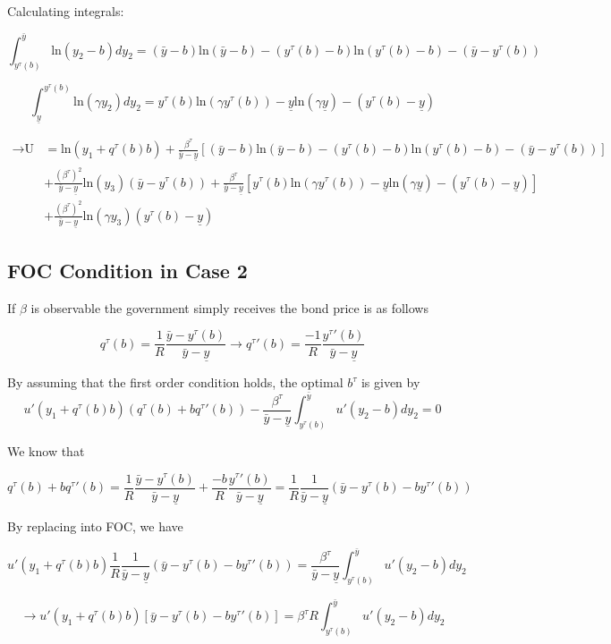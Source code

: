 \documentclass{article}
\begin{document}
Calculating integrals:

$$
\int_{y^\tau(b)}^{\bar{y}} \text{ln}(y_2 - b)dy_2 = (\bar{y} - b) \text{ln}(\bar{y} - b) - (y^\tau(b) - b) \text{ln}(y^\tau(b) - b) - (\bar{y} - y^\tau(b))
$$

$$
\int_{\underline{y}}^{y^\tau(b)} \text{ln}(\gamma y_2) dy_2 = y^\tau(b) \text{ln}(\gamma y^\tau(b)) - \underline{y} \text{ln}(\gamma \underline{y}) - (y^\tau(b) - \underline{y})
$$


\begin{align*}
     \rightarrow \text{U} &=  \text{ln}(y_1 + q^\tau(b)b) + \frac{\beta^\tau}{\bar{y} - \underline{y}} \left[(\bar{y} - b) \text{ln}(\bar{y} - b) - (y^\tau(b) - b) \text{ln}(y^\tau(b) - b) - (\bar{y} - y^\tau(b)) \right] \\
     & + \frac{{(\beta^\tau)}^2}{\bar{y} - \underline{y}} \text{ln}(y_3) (\bar{y} - y^\tau(b)) + \frac{\beta^\tau}{\bar{y} - \underline{y}} \left[y^\tau(b) \text{ln}(\gamma y^\tau(b)) - \underline{y} \text{ln}(\gamma \underline{y}) - (y^\tau(b) - \underline{y}) \right] \\
     & + \frac{{(\beta^\tau)}^2}{\bar{y} - \underline{y}} \text{ln}(\gamma y_3) (y^\tau(b) - \underline{y})
\end{align*}

\subsection*{FOC Condition in Case 2}

If $\beta$ is observable the government simply receives the bond price is as follows

$$ q^\tau(b) =\frac{1}{R} \frac{\bar{y} - y^\tau(b)}{\bar{y} - \underline{y}} \rightarrow q^\tau'(b) = \frac{-1}{R} \frac{y^\tau'(b)}{\bar{y} - \underline{y}}
$$ 

By assuming that the first order condition holds, the optimal $b^\tau$ is given by
$$
u' (y_1 + q^\tau(b)b) (q^\tau(b) + bq^\tau'(b)) - \frac{\beta^\tau}{\bar{y} - \underline{y}} \int_{y^\tau(b)}^{\bar{y}} u'(y_2 - b)dy_2 = 0
$$

We know that

$$
q^\tau(b) + bq^\tau'(b) = \frac{1}{R} \frac{\bar{y} - y^\tau(b)}{\bar{y} - \underline{y}} + \frac{-b}{R} \frac{y^\tau'(b)}{\bar{y} - \underline{y}} = \frac{1}{R} \frac{1}{\bar{y} - \underline{y}} (\bar{y} - y^\tau(b) - b y^\tau'(b))
$$

By replacing into FOC, we have

$$
u' (y_1 + q^\tau(b)b) \frac{1}{R} \frac{1}{\bar{y} - \underline{y}} (\bar{y} - y^\tau(b) - b y^\tau'(b)) = \frac{\beta^\tau}{\bar{y} - \underline{y}} \int_{y^\tau(b)}^{\bar{y}} u'(y_2 - b)dy_2
$$

$$
\rightarrow u' (y_1 + q^\tau(b)b) \left[\bar{y} - y^\tau(b) - b y^\tau'(b)\right] = \beta^\tau R \int_{y^\tau(b)}^{\bar{y}} u'(y_2 - b)dy_2
$$
\end{document}
